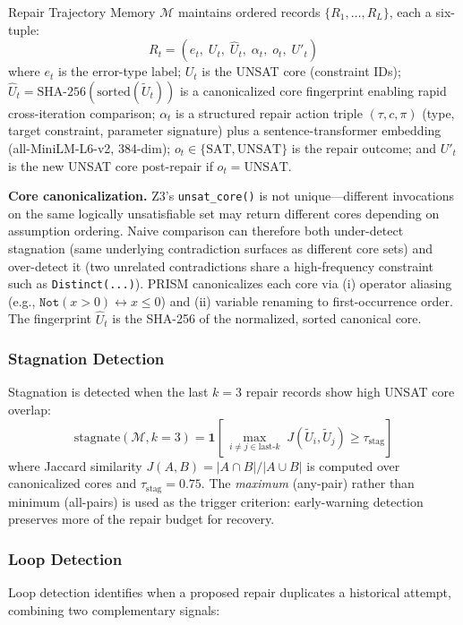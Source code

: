 Repair Trajectory Memory $\mathcal{M}$ maintains ordered records $\{R_1, \ldots, R_L\}$, each a six-tuple:
\[
R_t = (e_t,\; U_t,\; \hat{U}_t,\; \alpha_t,\; o_t,\; U'_t)
\]
where $e_t$ is the error-type label; $U_t$ is the UNSAT core (constraint IDs); $\hat{U}_t = \text{SHA-256}(\text{sorted}(\tilde{U}_t))$ is a canonicalized core fingerprint enabling rapid cross-iteration comparison; $\alpha_t$ is a structured repair action triple $(\tau, c, \pi)$ (type, target constraint, parameter signature) plus a sentence-transformer embedding (all-MiniLM-L6-v2, 384-dim); $o_t \in \{\text{SAT}, \text{UNSAT}\}$ is the repair outcome; and $U'_t$ is the new UNSAT core post-repair if $o_t = \text{UNSAT}$.

\textbf{Core canonicalization.} Z3's \texttt{unsat\_core()} is not unique—different invocations on the same logically unsatisfiable set may return different cores depending on assumption ordering. Naive comparison can therefore both under-detect stagnation (same underlying contradiction surfaces as different core sets) and over-detect it (two unrelated contradictions share a high-frequency constraint such as \texttt{Distinct(...)}). PRISM canonicalizes each core via (i) operator aliasing (e.g., $\texttt{Not}(x > 0) \leftrightarrow x \leq 0$) and (ii) variable renaming to first-occurrence order. The fingerprint $\hat{U}_t$ is the SHA-256 of the normalized, sorted canonical core.

\subsubsection{Stagnation Detection}

Stagnation is detected when the last $k = 3$ repair records show high UNSAT core overlap:
\[
\text{stagnate}(\mathcal{M}, k{=}3) = \mathbf{1}\!\left[\,\max_{i \neq j \in \text{last-}k}\; J(\tilde{U}_i, \tilde{U}_j) \geq \tau_{\text{stag}}\right]
\]
where Jaccard similarity $J(A, B) = |A \cap B| / |A \cup B|$ is computed over canonicalized cores and $\tau_{\text{stag}} = 0.75$. The \textit{maximum} (any-pair) rather than minimum (all-pairs) is used as the trigger criterion: early-warning detection preserves more of the repair budget for recovery.

\subsubsection{Loop Detection}

Loop detection identifies when a proposed repair duplicates a historical attempt, combining two complementary signals:

